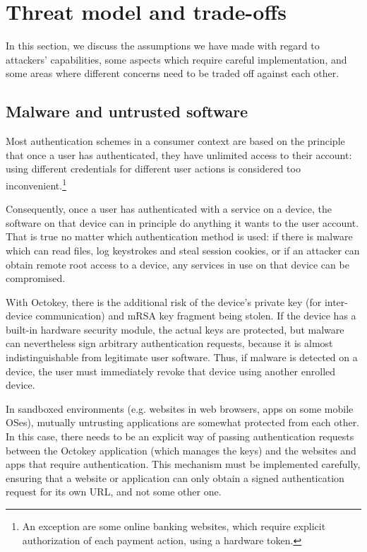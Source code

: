 \section{Threat model and trade-offs}\label{sec:threat}

In this section, we discuss the assumptions we have made with regard to attackers' capabilities,
some aspects which require careful implementation, and some areas where different concerns need to
be traded off against each other.

\subsection{Malware and untrusted software}\label{sec:malware}

Most authentication schemes in a consumer context are based on the principle that once a user has
authenticated, they have unlimited access to their account: using different credentials for
different user actions is considered too inconvenient.\footnote{An exception are some online banking
websites, which require explicit authorization of each payment action, using a hardware token.}

Consequently, once a user has authenticated with a service on a device, the software on that device
can in principle do anything it wants to the user account. That is true no matter which
authentication method is used: if there is malware which can read files, log keystrokes and steal
session cookies, or if an attacker can obtain remote root access to a device, any services in use on
that device can be compromised.

With Octokey, there is the additional risk of the device's private key (for inter-device
communication) and mRSA key fragment being stolen. If the device has a built-in hardware security
module, the actual keys are protected, but malware can nevertheless sign arbitrary authentication
requests, because it is almost indistinguishable from legitimate user software. Thus, if malware is
detected on a device, the user must immediately revoke that device using another enrolled device.

In sandboxed environments (e.g. websites in web browsers, apps on some mobile OSes), mutually
untrusting applications are somewhat protected from each other. In this case, there needs to be an
explicit way of passing authentication requests between the Octokey application (which manages the
keys) and the websites and apps that require authentication. This mechanism must be implemented
carefully, ensuring that a website or application can only obtain a signed authentication request
for its own URL, and not some other one.

